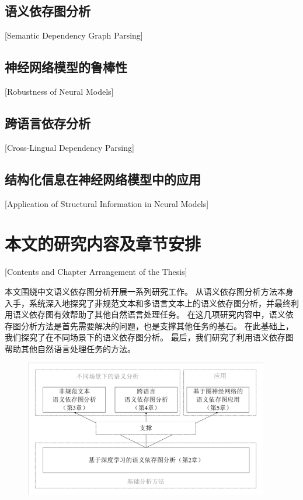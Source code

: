 \subsection{语义依存图分析}[Semantic Dependency Graph Parsing]

\subsection{神经网络模型的鲁棒性}[Robustness of Neural Models]

\subsection{跨语言依存分析}[Cross-Lingual Dependency Parsing]

\subsection{结构化信息在神经网络模型中的应用}[Application of Structural Information in Neural Models]


\section{本文的研究内容及章节安排}[Contents and Chapter Arrangement of the Thesis]

本文围绕中文语义依存图分析开展一系列研究工作。
从语义依存图分析方法本身入手，系统深入地探究了非规范文本和多语言文本上的语义依存图分析，并最终利用语义依存图有效帮助了其他自然语言处理任务。
在这几项研究内容中，语义依存图分析方法是首先需要解决的问题，也是支撑其他任务的基石。
在此基础上，我们探究了在不同场景下的语义依存图分析。
最后，我们研究了利用语义依存图帮助其他自然语言处理任务的方法。

\begin{figure}[htbp]
    \centering
    \includegraphics[width=0.95\textwidth]{figures/section_relation.pdf}
    \label{}
\end{figure}

